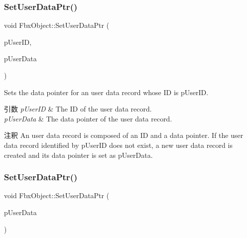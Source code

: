 \subsubsection{\texorpdfstring{Set\+User\+Data\+Ptr()}{SetUserDataPtr()}\hspace{0.1cm}{\footnotesize\ttfamily [1/2]}}
{\footnotesize\ttfamily void Fbx\+Object\+::\+Set\+User\+Data\+Ptr (\begin{DoxyParamCaption}\item[{const \hyperlink{fbxtypes_8h_a9beeca85cdc9941e912fe9eac7709b53}{Fbx\+U\+Int64} \&}]{p\+User\+ID,  }\item[{void $\ast$}]{p\+User\+Data }\end{DoxyParamCaption})}

Sets the data pointer for an user data record whose ID is p\+User\+ID. 
\begin{DoxyParams}{引数}
{\em p\+User\+ID} & The ID of the user data record. \\
\hline
{\em p\+User\+Data} & The data pointer of the user data record. \\
\hline
\end{DoxyParams}
\begin{DoxyRemark}{注釈}
An user data record is composed of an ID and a data pointer. If the user data record identified by p\+User\+ID does not exist, a new user data record is created and its data pointer is set as p\+User\+Data. 
\end{DoxyRemark}
\mbox{\label{class_fbx_object_af52325b1b5f2f1f5884d5d14d80c1922}} 
\subsubsection{\texorpdfstring{Set\+User\+Data\+Ptr()}{SetUserDataPtr()}\hspace{0.1cm}{\footnotesize\ttfamily [2/2]}}
{\footnotesize\ttfamily void Fbx\+Object\+::\+Set\+User\+Data\+Ptr (\begin{DoxyParamCaption}\item[{void $\ast$}]{p\+User\+Data }\end{DoxyParamCaption})}

